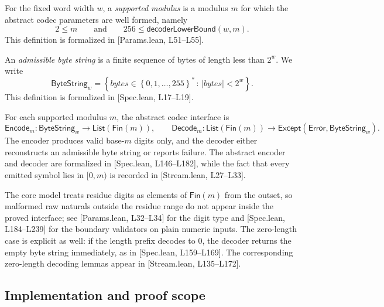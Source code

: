 \documentclass{system-security-article}
\newcommand{\abs}[1]{\left| #1 \right|}
\newcommand{\set}[1]{\left\{ #1 \right\}}
\newcommand{\setbuild}[2]{\left\{ #1 \,:\, #2 \right\}}
\providecommand{\href}[2]{#2}
\newcommand{\ByteString}{\mathsf{ByteString}}
\newcommand{\ByteStringBounded}{\ByteString_{w}}
\newcommand{\EncodeM}{\mathsf{Encode}_m}
\newcommand{\DecodeM}{\mathsf{Decode}_m}
\newcommand{\List}{\mathsf{List}}
\newcommand{\Fin}{\mathsf{Fin}}
\newcommand{\Except}{\mathsf{Except}}
\newcommand{\Error}{\mathsf{Error}}
\newcommand{\BaseM}{base-\(m\)}
\newcommand{\BytesVar}{\mathit{bytes}}
\newcommand{\LeanParams}[2]{\href{https://github.com/KyrylR/phd-symmetric-cryptography/blob/8e903222a7df1c4365592e4b16fa752a924b8977/lean/encoding-dr-1/EncodingProofs/BaseMLen/Params.lean\#L#1-L#2}{[Params.lean, L#1--L#2]}}
\newcommand{\LeanSpec}[2]{\href{https://github.com/KyrylR/phd-symmetric-cryptography/blob/8e903222a7df1c4365592e4b16fa752a924b8977/lean/encoding-dr-1/EncodingProofs/BaseMLen/Spec.lean\#L#1-L#2}{[Spec.lean, L#1--L#2]}}
\newcommand{\LeanStream}[2]{\href{https://github.com/KyrylR/phd-symmetric-cryptography/blob/8e903222a7df1c4365592e4b16fa752a924b8977/lean/encoding-dr-1/EncodingProofs/BaseMLen/Stream.lean\#L#1-L#2}{[Stream.lean, L#1--L#2]}}
\begin{document}
    \begin{definition}
        \label{def:supported-modulus}
        For the fixed word width \(w\), a \emph{supported modulus} is a modulus \(m\)
        for which the abstract codec parameters are well formed, namely
        \[
            2 \le m
            \qquad \text{and} \qquad
            256 \le \mathsf{decoderLowerBound}(w,m).
        \]
        This definition is formalized in \LeanParams{51}{55}.
    \end{definition}

    \begin{definition}
        \label{def:byte-string-bounded}
        An \emph{admissible byte string} is a finite sequence of bytes of length less than \(2^{w}\).
        We write
        \[
            \ByteStringBounded =
            \setbuild{\BytesVar \in \set{0,1,\ldots,255}^*}{\abs{\BytesVar} < 2^{w}}.
        \]
        This definition is formalized in \LeanSpec{17}{19}.
    \end{definition}

    For each supported modulus \(m\), the abstract codec interface is
    \[
        \EncodeM : \ByteStringBounded \to \List(\Fin(m)),
        \qquad
        \DecodeM : \List(\Fin(m)) \to \Except(\Error, \ByteStringBounded).
    \]
    The encoder produces valid \BaseM{} digits only, and the decoder either reconstructs an
    admissible byte string or reports failure.
    The abstract encoder and decoder are formalized in \LeanSpec{146}{182},
    while the fact that every emitted symbol lies in \([0,m)\) is recorded in \LeanStream{27}{33}.

    The core model treats residue digits as elements of \(\Fin(m)\) from the outset, so malformed raw
    naturals outside the residue range do not appear inside the proved interface; see \LeanParams{32}{34}
    for the digit type and \LeanSpec{184}{239} for the boundary validators on plain numeric inputs.
    The zero-length case is explicit as well: if the length prefix decodes to \(0\), the
    decoder returns the empty byte string immediately, as in \LeanSpec{159}{169}.
    The corresponding zero-length decoding lemmas appear in \LeanStream{135}{172}.

    \subsection{Implementation and proof scope}
    \label{subsec:boundary}
\end{document}
